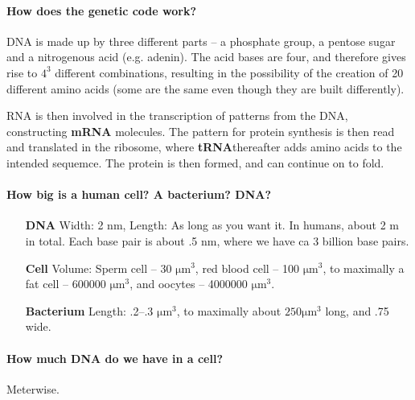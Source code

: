 \documentclass[a4paper,12pt]{article}
\begin{document}
         \vspace{3cm}
         
      \paragraph{How does the genetic code work?\\}
         DNA is made up by three different parts -- a phosphate group, a pentose
         sugar and a nitrogenous acid (e.g. adenin). The acid bases are four,
         and therefore gives rise to $4^3$ different combinations, resulting in
         the possibility of the creation of 20 different amino acids (some are
         the same even though they are built differently).

         RNA is then involved in the transcription of patterns from the DNA,
         constructing \textbf{mRNA} molecules. The pattern for protein synthesis
         is then read and translated in the ribosome, where \textbf{tRNA}thereafter adds
         amino acids to the intended sequemce. The protein is then formed, and
         can continue on to fold.

      \paragraph{How big is a human cell? A bacterium? DNA?\\}
         \begin{enumerate}
            \item [\textbf{DNA}] Width: 2 nm, Length: As long as you want it. In humans,
               about 2 m in total. Each base pair is about .5 nm, where we have
               ca 3 billion base pairs.
            
            \item [\textbf{Cell}] Volume: Sperm cell -- 30 $\si{\micro\m^3}$, red blood
               cell -- 100 $\si{\micro\m^3}$, to maximally a fat cell -- 600000 
               $\si{\micro\m^3}$, and oocytes -- 4000000 $\si{\micro\m^3}$.
            
            \item [\textbf{Bacterium}] Length: .2--.3 $\si{\micro\m^3}$, to maximally
               about $250 \si{\micro\m^3}$ long, and .75 wide. 
         \end{enumerate}

      \paragraph{How much DNA do we have in a cell?\\}
         Meterwise. 
\end{document}
